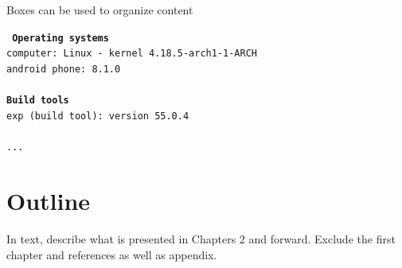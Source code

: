 Boxes can be used to organize content
\begin{tcolorbox}[title={Development environment for prototype}]
	\tt{
		\textbf{Operating systems }\\
		computer: Linux - kernel 4.18.5-arch1-1-ARCH\\
		android phone: 8.1.0\\
		~\\
		\textbf{Build tools}\\
		exp (build tool): version 55.0.4\\
		~\\
		...
	}
\end{tcolorbox}

\section{Outline}
In text, describe what is presented in Chapters 2 and forward. Exclude the first chapter and references as well as appendix. 
